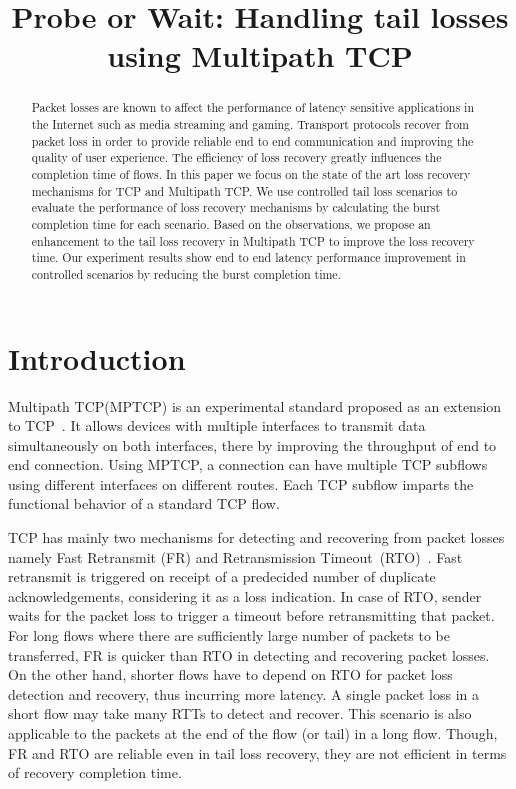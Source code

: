 \documentclass[10pt,conference,compsoc]{IEEEtran}
\title{Probe or Wait: Handling tail losses using Multipath TCP}
\author{\IEEEauthorblockN{Kiran~Yedugundla, Per~Hurtig, Anna~Brunstrom}
\IEEEauthorblockA{Dept. of Computer Science, Karlstad University, Karlstad, Sweden}}
\begin{document}
\maketitle

\begin{abstract}
Packet losses are known to affect the performance of latency sensitive applications in the Internet such as media streaming and gaming. Transport protocols recover from packet loss in order to provide reliable end to end communication and improving the quality of user experience. The efficiency of loss recovery greatly influences the completion time of flows. In this paper we focus on the state of the art loss recovery mechanisms for TCP and Multipath TCP. We use controlled tail loss scenarios to evaluate the performance of loss recovery mechanisms by calculating the burst completion time for each scenario. Based on the observations, we propose an enhancement to the tail loss recovery in Multipath TCP to improve the loss recovery time. Our experiment results show end to end latency performance improvement in controlled scenarios by reducing the burst completion time. 
\end{abstract}

\section{Introduction}


Multipath TCP(MPTCP) is an experimental standard proposed as an extension to TCP~\cite{rfc6824}. It allows devices with multiple interfaces to transmit data simultaneously on both interfaces, there by improving the throughput of end to end connection. Using MPTCP, a connection can have multiple TCP subflows using different interfaces on different routes. Each TCP subflow imparts the functional behavior of a standard TCP flow. 

TCP has mainly two mechanisms for detecting and recovering from packet losses namely Fast Retransmit (FR) and Retransmission Timeout~(RTO)~\cite{Flach:2013}. Fast retransmit is triggered on receipt of a predecided number of duplicate acknowledgements, considering it as a loss indication. In case of RTO, sender waits for the packet loss to trigger a timeout before retransmitting that packet. For long flows where there are sufficiently large number of packets to be transferred, FR is quicker than RTO in detecting and recovering packet losses. On the other hand, shorter flows have to depend on RTO for packet loss detection and recovery, thus incurring more latency. A single packet loss in a short flow may take many RTTs to detect and recover. This scenario is also applicable to the packets at the end of the flow (or tail) in a long flow. Though, FR and RTO are reliable even in tail loss recovery, they are not efficient in terms of recovery completion time. 
\end{document}
